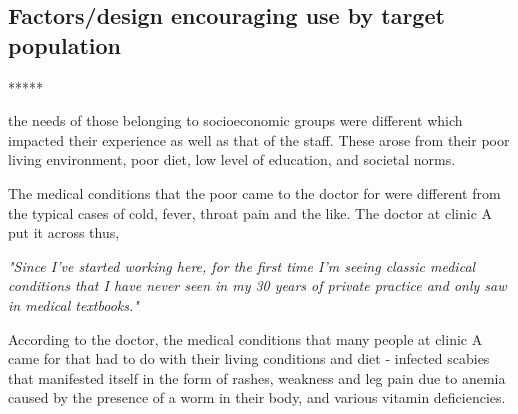 





\subsection{Factors/design encouraging use by target population}

*****


 the needs of those belonging to socioeconomic groups were different which impacted their experience as well as that of the staff. These arose from their poor living environment, poor diet, low level of education, and societal norms.

The medical conditions that the poor came to the doctor for were different from the typical cases of cold, fever, throat pain and the like. The doctor at clinic A put it across thus,

\textit{"Since I've started working here, for the first time I'm seeing classic medical conditions that I have never seen in my 30 years of private practice and only saw in medical textbooks."}

According to the doctor, the medical conditions that many people at clinic A came for that had to do with their living conditions and diet - infected scabies that manifested itself in the form of rashes, weakness and leg pain due to anemia caused by the presence of a worm in their body, and various vitamin deficiencies.

